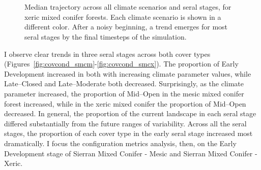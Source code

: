 \begin{figure}[htbp]
 \captionsetup[subfigure]{labelformat=empty}
  \centering
  \\%
   \\
    \caption{Median trajectory across all climate scenarios and seral stages, for xeric mixed conifer forests. Each climate scenario is shown in a different color. After a noisy beginning, a trend emerges for most seral stages by the final timesteps of the simulation.}
  \label{fig:median_trajectory_smcx}
\end{figure} %

I observe clear trends in three seral stages across both cover types (Figures~\ref{fig:covcond_smcm}-\ref{fig:covcond_smcx}). The proportion of Early Development increased in both with increasing climate parameter values, while Late--Closed and Late--Moderate both decreased. Surprisingly, as the climate parameter increased, the proportion of Mid--Open in the mesic mixed conifer forest increased, while in the xeric mixed conifer the proportion of Mid--Open decreased. In general, the proportion of the current landscape in each seral stage differed substantially from the future ranges of variability. Across all the seral stages, the proportion of each cover type in the early seral stage increased most dramatically. I focus the configuration metrics analysis, then, on the Early Development stage of Sierran Mixed Conifer - Mesic and Sierran Mixed Conifer - Xeric.

